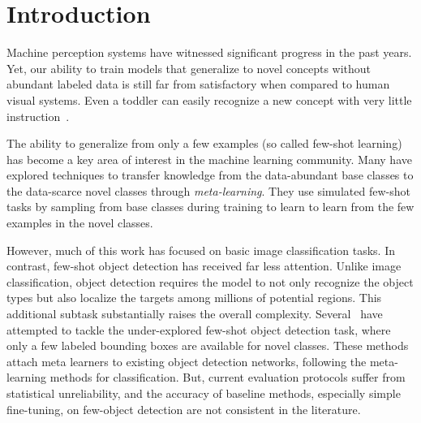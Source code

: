 \section{Introduction}
Machine perception systems have witnessed significant progress in the past years.
Yet, our ability to train models that generalize to novel concepts without abundant labeled data is still far from satisfactory  when compared to human visual systems. 
Even a toddler can easily recognize a new concept with very little instruction~\cite{landau1988importance,samuelson2005they,smith2002object}.

The ability to generalize from only a few examples (so called few-shot learning) has become a key area of interest in the machine learning community.
Many \cite{vinyals2016matching,snell2017prototypical,finn2017model,hariharan2017low,gidaris2018dynamic,wang2019tafe} have explored techniques to transfer knowledge from the data-abundant base classes to the data-scarce novel classes through \emph{meta-learning}. 
They use simulated few-shot tasks by sampling from base classes during training to learn to learn from the few examples in the novel classes.

However, much of this work has focused on basic image classification tasks. 
In contrast, few-shot object detection has received far less attention. 
Unlike image classification, object detection requires the model to not only recognize the object types but also localize the targets among millions of potential regions. This additional subtask substantially
raises the overall complexity. Several~\cite{kang2019few,yan2019meta,wang2019meta} have attempted to tackle the under-explored few-shot object detection task, where only a few labeled bounding boxes are available for novel classes. These methods attach meta learners to existing object detection networks, following the meta-learning methods for classification. But, current evaluation protocols suffer from statistical unreliability, and the accuracy of baseline methods, especially simple fine-tuning, on few-object detection are not consistent in the literature.



